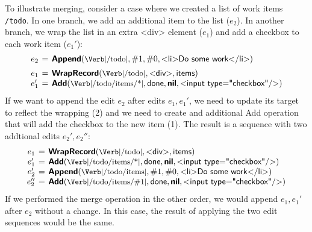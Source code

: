 \documentclass[sigconf,anonymous,screen]{acmart}
\newcommand{\ident}[1]{{\sffamily #1}}
\newcommand{\srcid}[1]{\textnormal{\sffamily #1}}
\newcommand{\srckvd}[1]{\textnormal{\sffamily\bfseries #1}}
\begin{document}
To illustrate merging, consider a case where we created a list of work items {\small\Verb|/todo|}.
In one branch, we add an additional item to the list ($e_2$). In another branch, we wrap the
list in an extra \ident{<div>} element ($e_1$) and add a checkbox to each work item ($e_1'$):
%
\begin{equation*}
\arraycolsep=2pt
\begin{array}{rcl}
e_2 &=& \srckvd{Append}(\textnormal{\small\Verb|/todo|}, \#1, \#0, \srcid{<li>Do some work</li>})\\[0.5em]
e_1 &=& \srckvd{WrapRecord}(\textnormal{\small\Verb|/todo|}, \srcid{<div>}, \srcid{items})\\
e_1' &=& \srckvd{Add}(\textnormal{\small\Verb|/todo/items/*|}, \srcid{done}, \srckvd{nil}, \srcid{<input type="checkbox"/>})\\
\end{array}
\end{equation*}
%
If we want to append the edit $e_2$ after edits $e_1, e_1'$, we need to update its target to
reflect the wrapping (2) and we need to create and additional \ident{Add} operation
that will add the checkbox to the new item (1). The result is a sequence with two addtional edits $e_2', e_2''$:
%
\begin{equation*}
\arraycolsep=2pt
\begin{array}{rcl}
  e_1 &=& \srckvd{WrapRecord}(\textnormal{\small\Verb|/todo|}, \srcid{<div>}, \srcid{items})\\
  e_1' &=& \srckvd{Add}(\textnormal{\small\Verb|/todo/items/*|}, \srcid{done}, \srckvd{nil}, \srcid{<input type="checkbox"/>})\\
e_2'  &=& \srckvd{Append}(\textnormal{\small\Verb|/todo/items|}, \#1, \#0, \srcid{<li>Do some work</li>})\\
e_2'' &=& \srckvd{Add}(\textnormal{\small\Verb|/todo/items/\#1|}, \srcid{done}, \srckvd{nil}, \srcid{<input type="checkbox"/>})\\
\end{array}
\end{equation*}
%
If we performed the merge operation in the other order, we would append $e_1, e_1'$ after
$e_2$ without a change. In this case, the result of applying the two edit sequences would be the
same.


\end{document}
